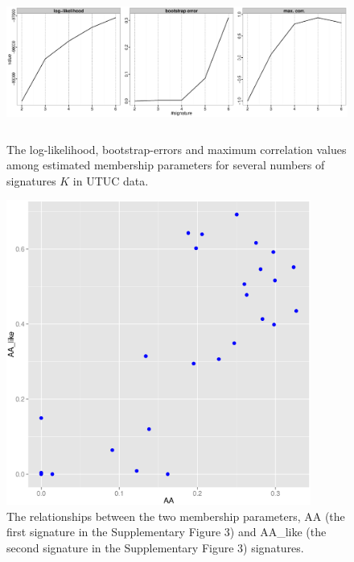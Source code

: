 \documentclass{article}
\begin{document}
\clearpage

\begin{figure}
\centering
\includegraphics[width=15cm,height=5cm]{UTUC_stat.eps}
\caption{The log-likelihood, bootstrap-errors and maximum correlation values among estimated membership parameters for several numbers of signatures $K$ in UTUC data.}
\label{UTUC_stat}
\end{figure}

\clearpage

\begin{figure}
\centering
\includegraphics[width=10cm,height=10cm]{UTUC_AA_AAlike_cor.eps}
\caption{The relationships between the two membership parameters, AA (the first signature in the Supplementary Figure 3) and AA\_like (the second signature in the Supplementary Figure 3) signatures.}
\label{UTUT_AA_AAlike}
\end{figure}


\clearpage
\end{document}
